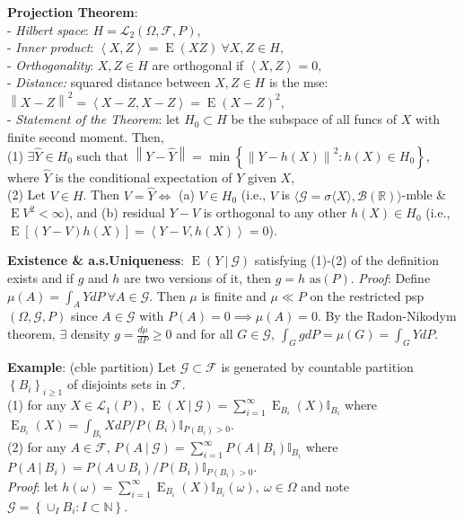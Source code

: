 \documentclass[paper=letter,fontsize=2.89mm]{scrartcl}
\DeclareMathOperator{\E}{E}
\newcommand\given[1][]{\:#1\vert\:}
\newcommand{\Borel}{\mathcal{B}}
\newcommand{\R}{\mathbb{R}}
\newcommand{\N}{\mathbb{N}}
\newcommand\indicate[1]{\mathbb{I}_{ #1 }}
\newcommand\norm[1]{\left\lVert #1 \right\rVert}
\newcommand\inner[1]{\left\langle #1 \right\rangle}
\newcommand\set[1]{\left\{ #1 \right\}}
\begin{document}
\begin{multicols*}{3}
\textbf{Projection Theorem}: \\
- \emph{Hilbert space}: $H = \mathcal{L}_2(\Omega, \mathcal{F}, P)$, \\
- \emph{Inner product}: $\inner{X, Z} = \E(XZ) ~ \forall X,Z\in H$, \\
- \emph{Orthogonality}: $X,Z\in H$ are orthogonal if $\inner{X,Z} = 0$, \\
- \emph{Distance:} squared distance between $X,Z\in H$ is the mse: $\norm{X - Z}^2 = \inner{X - Z, X - Z} = \E(X - Z)^2$, \\
- \emph{Statement of the Theorem}: let $H_0 \subset H$ be the subspace of all funcs of $X$ with finite second moment. Then, \\
(1) $\exists \hat{Y} \in H_0$ such that $\norm{Y - \hat{Y}} = \min \set{ \norm{Y - h(X)}^2: h(X) \in H_0}$, where $\hat{Y}$ is the conditional expectation of $Y$ given $X$, \\
(2) Let $V \in H$. Then $V = \hat{Y} \iff$ (a) $V \in H_0$ (i.e., $V$ is $\langle \mathcal{G} = \sigma\langle X\rangle, \Borel(\R)\rangle$-mble \& $\E V^2 < \infty$), and (b) residual $Y - V$ is orthogonal to any other $h(X) \in H_0$ (i.e., $\E[(Y - V)h(X)] = \inner{Y - V, h(X) } = 0$). \\ \medskip

\textbf{Existence \& a.s.\@ Uniqueness}: $\E(Y\given\mathcal{G})$ satisfying (1)-(2) of the definition exists and if $g$ and $h$ are two versions of it, then $g = h \text{ as}(P)$. \emph{Proof}: 
Define $\mu(A) = \int_A Y dP ~ \forall A \in \mathcal{G}$. Then $\mu$ is finite and $\mu \ll P$ on the restricted psp $(\Omega, \mathcal{G}, P)$ since $A \in \mathcal{G}$ with $P(A) = 0 \implies \mu(A) = 0$. By the Radon-Nikodym theorem, $\exists$ density $g = \frac{d\mu}{dP} \ge 0$ and for all $G \in \mathcal{G}$, $\int_G gdP = \mu(G) = \int_G Y dP$. \\ \medskip

\textbf{Example}: (cble partition) Let $\mathcal{G} \subset \mathcal{F}$ is generated by countable partition $\set{B_i}_{i\ge1}$ of disjoints sets in $\mathcal{F}$. \\
(1) for any $X \in \mathcal{L}_1(P)$, $\E(X \given \mathcal{G}) = \sum_{i=1}^\infty \E_{B_i}(X) \indicate{B_i}$ where $\E_{B_i}(X) = \int_{B_i} X dP / P(B_i) \indicate{P(B_i) > 0}$. \\
(2) for any $A \in \mathcal{F}$, $P(A \given \mathcal{G}) = \sum_{i=1}^\infty P(A \given B_i)\indicate{B_i}$ where $P(A \given B_i) = P(A \cup B_i)/ P(B_i) \indicate{P(B_i) > 0}$. \\ 
\emph{Proof}: let $h(\omega) = \sum_{i=1}^\infty \E_{B_i}(X) \indicate{B_i}(\omega),~ \omega \in \Omega$ and note $\mathcal{G} = \set{\cup_I B_i: I \subset \N}$. \\ \medskip


\end{multicols*}
\end{document}
